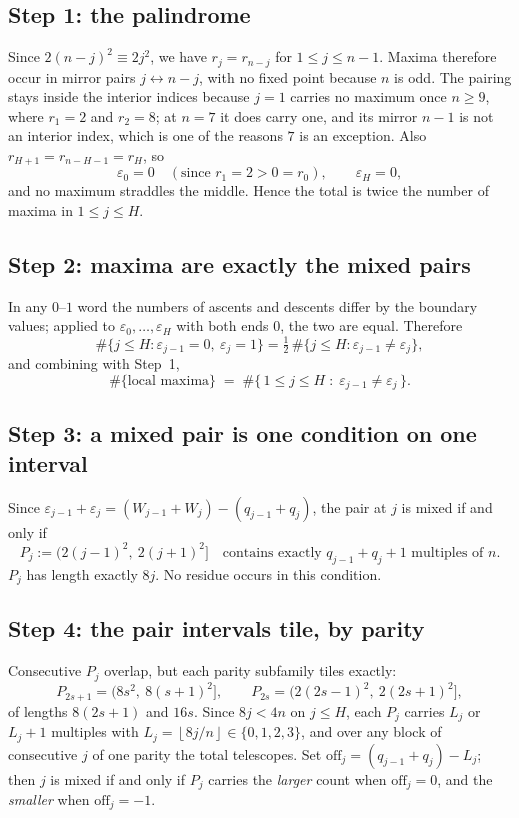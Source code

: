 \documentclass[11pt,reqno]{amsart}
\theoremstyle{plain}
\theoremstyle{remark}
\numberwithin{equation}{section}
\newcommand{\fl}[1]{\left\lfloor #1 \right\rfloor}
\begin{document}
\subsection{Step 1: the palindrome}

Since $2(n-j)^2 \equiv 2j^2$, we have $r_j = r_{n-j}$ for $1 \le j \le n-1$.
Maxima therefore occur in mirror pairs $j \leftrightarrow n-j$, with no fixed
point because $n$ is odd. The pairing stays inside the interior indices because
$j = 1$ carries no maximum once $n \ge 9$, where $r_1 = 2$ and $r_2 = 8$; at
$n = 7$ it does carry one, and its mirror $n-1$ is not an interior index, which
is one of the reasons $7$ is an exception. Also $r_{H+1} = r_{n-H-1} = r_H$, so
\[
  \varepsilon_0 = 0 \quad (\text{since } r_1 = 2 > 0 = r_0), \qquad
  \varepsilon_H = 0,
\]
and no maximum straddles the middle. Hence the total is twice the number of
maxima in $1 \le j \le H$.

\subsection{Step 2: maxima are exactly the mixed pairs}

In any $0$--$1$ word the numbers of ascents and descents differ by the boundary
values; applied to $\varepsilon_0,\dots,\varepsilon_H$ with both ends $0$, the
two are equal. Therefore
\[
  \#\{j \le H : \varepsilon_{j-1}=0,\ \varepsilon_j=1\}
  = \tfrac12\,\#\{j \le H : \varepsilon_{j-1} \ne \varepsilon_j\},
\]
and combining with Step~1,
\[
  \#\{\text{local maxima}\}
  \;=\; \#\{\,1 \le j \le H \;:\; \varepsilon_{j-1} \ne \varepsilon_j\,\}.
\]

\subsection{Step 3: a mixed pair is one condition on one interval}

Since $\varepsilon_{j-1}+\varepsilon_j = (W_{j-1}+W_j) - (q_{j-1}+q_j)$, the
pair at $j$ is mixed if and only if
\[
  P_j := \bigl(2(j-1)^2,\ 2(j+1)^2\bigr]
  \quad\text{contains exactly } q_{j-1}+q_j+1 \text{ multiples of } n.
\]
$P_j$ has length exactly $8j$. No residue occurs in this condition.

\subsection{Step 4: the pair intervals tile, by parity}

Consecutive $P_j$ overlap, but each parity subfamily tiles exactly:
\[
  P_{2s+1} = \bigl(8s^2,\ 8(s+1)^2\bigr], \qquad
  P_{2s}   = \bigl(2(2s-1)^2,\ 2(2s+1)^2\bigr],
\]
of lengths $8(2s+1)$ and $16s$. Since $8j < 4n$ on $j \le H$, each $P_j$ carries
$L_j$ or $L_j+1$ multiples with $L_j = \fl{8j/n} \in \{0,1,2,3\}$, and over any
block of consecutive $j$ of one parity the total telescopes. Set
$\mathrm{off}_j = (q_{j-1}+q_j)-L_j$; then $j$ is mixed if and only if $P_j$
carries the \emph{larger} count when $\mathrm{off}_j = 0$, and the
\emph{smaller} when $\mathrm{off}_j = -1$.
\end{document}
